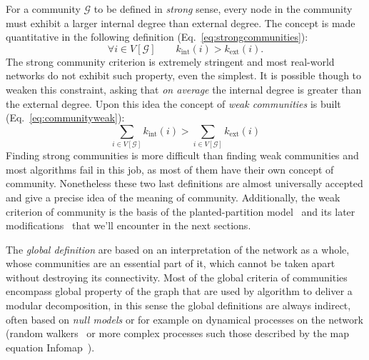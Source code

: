 For a community $\mathcal{G}$ to be defined in \emph{strong} sense, every node in the community must exhibit a larger internal degree than external degree. The concept is made quantitative in the following definition (Eq.~\ref{eq:strongcommunities}):
\begin{equation}\label{eq:strongcommunities}
\forall i \in V[\mathcal{G}] \qquad k_{\textrm{int}}(i) > k_{\textrm{ext}}(i).
\end{equation}
The strong community criterion is extremely stringent and most real-world networks do not exhibit such property, even the simplest.
It is possible though to weaken this constraint, asking that \emph{on average} the internal degree is greater than the external degree.  Upon this idea the concept of \emph{weak communities} is built (Eq.~\ref{eq:communityweak}):
\begin{equation}\label{eq:communityweak}
\sum \limits_{i \in V[\mathcal{G}]} k_{\textrm{int}}(i) > \sum \limits_{i \in V[\mathcal{G}]} k_{\textrm{ext}}(i)
\end{equation}
Finding strong communities is more difficult than finding weak communities and most algorithms fail in this job, as most of them have their own concept of community. Nonetheless these two last definitions are almost universally accepted and give a precise idea of the meaning of community. Additionally, the weak criterion of community is the basis of the planted-partition model~\cite{condon2000} and its later modifications~\cite{lancichinetti2008} that we'll encounter in the next sections. 

The \emph{global definition} are based on an interpretation of the network as a whole, whose communities are an essential part of it, which cannot be taken apart without destroying its connectivity. Most of the global criteria of communities encompass global property of the graph that are used by algorithm to deliver a modular decomposition, in this sense the global definitions are always indirect, often based on \emph{null models} or for example on dynamical processes on the network (random walkers~\cite{pons2006} or more complex processes such those described by the map equation  Infomap~\cite{rosvall2008}).

